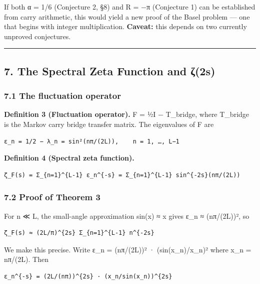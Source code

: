 \documentclass[
  11pt,
]{article}
\begin{document}
If both α = 1/6 (Conjecture 2, §8) and R = −π (Conjecture 1) can be established
from carry arithmetic, this would yield a new proof of the Basel problem --- one
that begins with integer multiplication. \textbf{Caveat:} this depends on two
currently unproved conjectures.

\begin{center}\rule{0.5\linewidth}{0.5pt}\end{center}

\newpage

\subsection{7. The Spectral Zeta Function and
ζ(2s)}\label{the-spectral-zeta-function-and-ux3b62s}

\subsubsection{7.1 The fluctuation operator}\label{the-fluctuation-operator}

\textbf{Definition 3 (Fluctuation operator).} F = ½I − T\_bridge, where
T\_bridge is the Markov carry bridge transfer matrix. The eigenvalues of F are

\begin{verbatim}
ε_n = 1/2 − λ_n = sin²(nπ/(2L)),    n = 1, …, L−1
\end{verbatim}

\textbf{Definition 4 (Spectral zeta function).}

\begin{verbatim}
ζ_F(s) = Σ_{n=1}^{L-1} ε_n^{-s} = Σ_{n=1}^{L-1} sin^{-2s}(nπ/(2L))
\end{verbatim}

\subsubsection{7.2 Proof of Theorem 3}\label{proof-of-theorem-3}

For n ≪ L, the small-angle approximation sin(x) ≈ x gives ε\_n ≈ (nπ/(2L))², so

\begin{verbatim}
ζ_F(s) ≈ (2L/π)^{2s} Σ_{n=1}^{L-1} n^{-2s}
\end{verbatim}

We make this precise. Write ε\_n = (nπ/(2L))² · (sin(x\_n)/x\_n)² where x\_n =
nπ/(2L). Then

\begin{verbatim}
ε_n^{-s} = (2L/(nπ))^{2s} · (x_n/sin(x_n))^{2s}
\end{verbatim}
\end{document}
